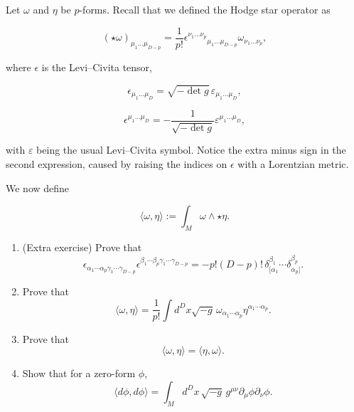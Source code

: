 \begin{Problem}

Let $\omega$ and $\eta$ be $p$-forms. Recall that we defined the Hodge star operator as

\[
(\star\omega)_{\mu_1\ldots\mu_{D-p}}
=
\frac{1}{p!}
\epsilon^{\nu_1\ldots\nu_p}{}_{\mu_1\ldots\mu_{D-p}}
\omega_{\nu_1\ldots\nu_p},
\]

where $\epsilon$ is the Levi--Civita tensor,

\[
\epsilon_{\mu_1\ldots\mu_D}
=
\sqrt{-\det g}\,
\varepsilon_{\mu_1\ldots\mu_D},
\]

\[
\epsilon^{\mu_1\ldots\mu_D}
=
-\frac{1}{\sqrt{-\det g}}
\varepsilon^{\mu_1\ldots\mu_D},
\]

with $\varepsilon$ being the usual Levi--Civita symbol. Notice the extra minus sign in the second expression, caused by raising the indices on $\epsilon$ with a Lorentzian metric.

We now define

\[
\langle\omega,\eta\rangle
:=
\int_M
\omega\wedge\star\eta.
\]

\begin{enumerate}

\item[(a)] (Extra exercise) Prove that
\[
\epsilon_{\alpha_1\cdots\alpha_p\gamma_1\cdots\gamma_{D-p}}
\epsilon^{\beta_1\cdots\beta_p\gamma_1\cdots\gamma_{D-p}}
=
-p!(D-p)!
\,\delta^{\beta_1}_{[\alpha_1}
\cdots
\delta^{\beta_p}_{\alpha_p]}.
\]

\item[(b)] Prove that
\[
\langle\omega,\eta\rangle
=
\frac{1}{p!}
\int
d^Dx
\sqrt{-g}\,
\omega_{\alpha_1\cdots\alpha_p}
\eta^{\alpha_1\cdots\alpha_p}.
\]

\item[(c)] Prove that
\[
\langle\omega,\eta\rangle
=
\langle\eta,\omega\rangle.
\]

\item[(d)] Show that for a zero-form $\phi$,
\[
\langle d\phi,d\phi\rangle
=
\int_M
d^Dx\,
\sqrt{-g}\,
g^{\mu\nu}
\partial_\mu\phi
\partial_\nu\phi.
\]

\end{enumerate}

\end{Problem}
